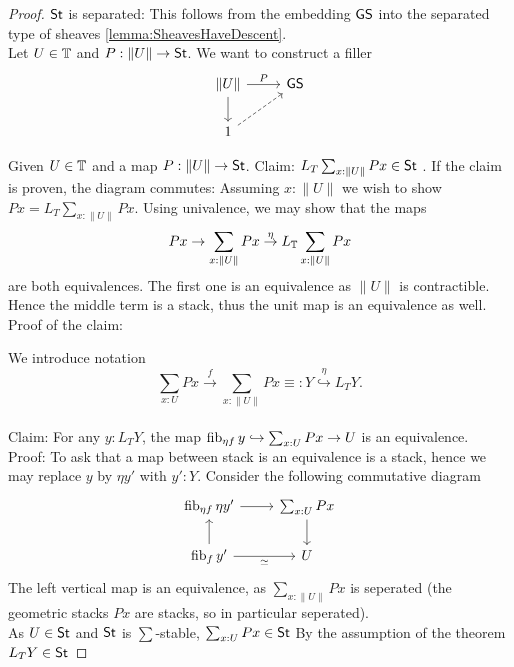 \begin{proof}
	$\mathsf{St}$ is separated: This follows from the embedding $\mathsf{GS}$ into the separated type of sheaves \ref{lemma:SheavesHaveDescent}. \\
	Let $U \in \mathbb{T}$ and $P : \|U\| \to \mathsf{St}$. We want to construct a filler 
	\[\begin{tikzcd}
		{\| U\|} & \GS \\
		1
		\arrow["P", from=1-1, to=1-2]
		\arrow[from=1-1, to=2-1]
		\arrow[dashed, from=2-1, to=1-2]
	\end{tikzcd}\]
	
	Given $U \in \mathbb{T}$ and a map $P : \|U\| \to \mathsf{St}$. Claim: $L_T \sum_{x: \|U\|} P x \in \mathsf{St}$ . 
	If the claim is proven, the diagram commutes: Assuming $x : \|U\|$ we wish to show $P x = L_T \sum_{x: \|U\|} P x$. Using univalence, we may show that the maps 
	\[P x \to \sum_{x: \|U\|} P x \overset{\eta}{\to} L_{\mathbb{T}} \sum_{x: \|U\|} P x\]
	are both equivalences.
	The first one is an equivalence as $\|U\|$ is contractible. Hence the middle term is a stack, thus the unit map is an equivalence as well. \\
	Proof of the claim:
	

	We introduce notation 
	\[ \sum_{x : U} P x \overset{f}{\to} \sum_{x: \|U\|} P x \equiv: Y \overset{\eta}{\hookrightarrow} L_T Y  .\] \\
	Claim: For any $y : L_T Y$, the map $\operatorname{fib}_{\eta f}{y} \hookrightarrow \sum_{x: U} P x \to U$ is an equivalence.  \\
	Proof: To ask that a map between stack is an equivalence is a stack, hence we may replace $y$ by $\eta y'$ with $y' : Y$.
	Consider the following commutative diagram
	\[\begin{tikzcd}
		{\fib_{\eta f} \eta y'} & {\sum_{x : U} P x} \\
		{\fib_{f} y'} & {U}
		\arrow[from=1-1, to=1-2]
		\arrow[from=1-2, to=2-2]
		\arrow[from=2-1, to=1-1]
		\arrow["\simeq"', from=2-1, to=2-2]
	\end{tikzcd}\]
	The left vertical map is an equivalence, as $\sum_{x:\|U\|} P x$ is seperated (the geometric stacks $P x$ are stacks, so in particular seperated). \\
	As $U \in \mathsf{St}$ and $\mathsf{St}$ is $\sum$-stable,  $\sum_{x: U} P x \in \mathsf{St}$ By the assumption of the theorem $L_T Y \in \mathsf{St}$ %
	
\end{proof}
